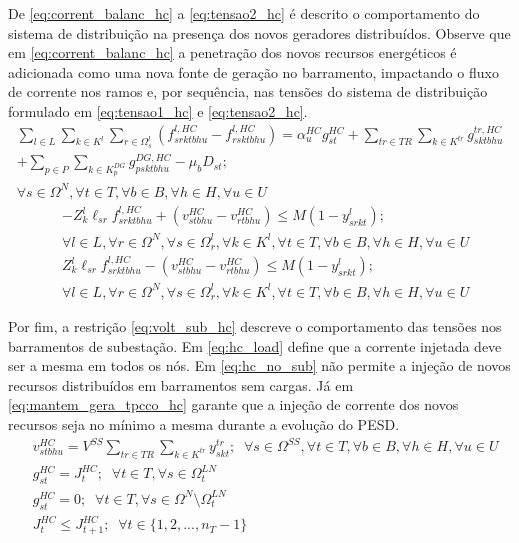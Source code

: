 De \eqref{eq:corrent_balanc_hc} a \eqref{eq:tensao2_hc} é descrito o comportamento do sistema de distribuição na presença dos novos geradores distribuídos. Observe que em \eqref{eq:corrent_balanc_hc} a penetração dos novos recursos energéticos é adicionada como uma nova fonte de geração no barramento, impactando o fluxo de corrente nos ramos e, por sequência, nas tensões do sistema de distribuição formulado em \eqref{eq:tensao1_hc} e \eqref{eq:tensao2_hc}.
\begin{align}
    \sum_{l \in L}\sum_{k \in K^{l}} \sum_{r \in \Omega^l_s} (f^{l, HC}_{srktbhu} - f^{l, HC}_{rsktbhu}) = \alpha^{HC}_u g_{st}^{HC} + 
    \sum_{tr \in TR} \sum_{k \in K^{tr}} g^{tr, HC}_{sktbhu} \nonumber \\ + \sum_{p \in P}\sum_{k\in K^{DG}_p} g^{DG, HC}_{psktbhu} - \mu_bD_{st}; \nonumber\\
    \forall s \in \Omega^N, \forall t \in T, \forall b \in B, \forall h \in H, \forall u \in U
    \label{eq:corrent_balanc_hc}
\end{align}
\begin{align}
&- Z^l_{k}\ell_{sr}f^{l, HC}_{srktbhu} + (v_{stbhu}^{HC} - v_{rtbhu}^{HC}) \leq  M(1 - y^l_{srkt}); \nonumber\\
&\forall l \in L, \forall r \in \Omega^N, \forall s \in \Omega^{l}_r, \forall k \in K^{l}, \forall t \in T, \forall b \in B, \forall h \in H, \forall u \in U
 \label{eq:tensao1_hc}\\
&Z^l_{k}\ell_{sr}f^{l, HC}_{srktbhu} - (v_{stbhu}^{HC} - v_{rtbhu}^{HC}) \leq  M(1 - y^l_{srkt}); \nonumber\\
&\forall l \in L, \forall r \in \Omega^N, \forall s \in \Omega^{l}_r, \forall k \in K^{l}, \forall t \in T, \forall b \in B, \forall h \in H, \forall u \in U
\label{eq:tensao2_hc}
\end{align}

Por fim, a restrição \eqref{eq:volt_sub_hc} descreve o comportamento das tensões nos barramentos de subestação. Em \eqref{eq:hc_load} define que a corrente injetada deve ser a mesma em todos os nós. Em \eqref{eq:hc_no_sub} não permite a injeção de novos recursos distribuídos em barramentos sem cargas. Já em \eqref{eq:mantem_gera_tpcco_hc} garante que a injeção de corrente dos novos recursos seja no mínimo a mesma durante a evolução do \ac{PESD}.
\begin{align}
&v_{stbhu}^{HC} = V^{SS} \sum_{tr \in TR}\sum_{k \in K^{tr}} y^{tr}_{skt} ; \; \; \forall s \in \Omega^{SS}, \forall t \in T, \forall b \in B, \forall h \in H, \forall u \in U
\label{eq:volt_sub_hc}\\
&g^{HC}_{st} = J^{HC}_t;\; \; \forall t \in T, \forall s \in   \Omega^{LN}_t\label{eq:hc_load}\\
&g^{HC}_{st} = 0;\; \; \forall t \in T, \forall s \in   \Omega^{N}\setminus \Omega^{LN}_t\label{eq:hc_no_sub}\\
&J^{HC}_{t} \leq J^{HC}_{{t+1}}; \; \; \forall t \in \{1, 2, ..., n_{T} -1 \}
\label{eq:mantem_gera_tpcco_hc}
\end{align}


